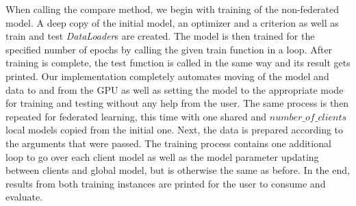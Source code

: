 When calling the compare method, we begin with training of the non-federated model. A deep copy of the initial model, an optimizer and a criterion as well as train and test \textit{DataLoader}s are created. The model is then trained for the specified number of epochs by calling the given train function in a loop. After training is complete, the test function is called in the same way and its result gets printed. Our implementation completely automates moving of the model and data to and from the GPU as well as setting the model to the appropriate mode for training and testing without any help from the user. 
The same process is then repeated for federated learning, this time with one shared  and $ number\_of\_clients $ local models copied from the initial one. Next, the data is prepared according to the arguments that were passed. The training process contains one additional loop to go over each client model as well as the model parameter updating between clients and global model, but is otherwise the same as before.
In the end, results from both training instances are printed for the user to consume and evaluate.